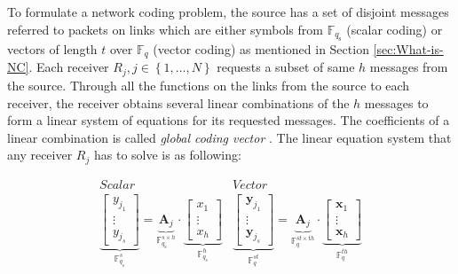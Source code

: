 To formulate a network coding problem, the source has a set of disjoint
messages referred to packets on links which are either symbols from
$\ensuremath{\mathbb{F}}_{q_{\mathrm{s}}}$ (scalar coding) or vectors
of length $t$ over $\ensuremath{\mathbb{F}}_{q}$ (vector coding)
as mentioned in Section \ref{sec:What-is-NC}. Each receiver $R_{j},j\in\left\{ 1,\ldots,N\right\} $
requests a subset of same $h$ messages from the source. Through all
the functions on the links from the source to each receiver, the receiver
obtains several linear combinations of the $h$ messages to form a
linear system of equations for its requested messages. The coefficients
of a linear combination is called \textit{global coding vector} \cite{Sanders:2003}.
The linear equation system that any receiver $R_{j}$ has to solve
is as following:

\begin{equation}
\begin{array}{c|c}
Scalar & Vector\\
\underset{\ensuremath{\mathbb{F}}_{q_{\mathrm{s}}}^{s}}{\underbrace{\left[\begin{array}{c}
y_{j_{1}}\\
\vdots\\
y_{j_{s}}
\end{array}\right]}}=\underset{\ensuremath{\mathbb{F}}_{q_{\mathrm{s}}}^{s\times h}}{\underbrace{\boldsymbol{A}_{j}}}\cdot\underset{\ensuremath{\mathbb{F}}_{q_{s}}^{h}}{\underbrace{\left[\begin{array}{c}
x_{1}\\
\vdots\\
x_{h}
\end{array}\right]}} & \underset{\ensuremath{\mathbb{F}}_{q}^{st}}{\underbrace{\left[\begin{array}{c}
\boldsymbol{y}_{j_{1}}\\
\vdots\\
\boldsymbol{y}_{j_{s}}
\end{array}\right]}}=\underset{\ensuremath{\mathbb{F}}_{q}^{st\times th}}{\underbrace{\boldsymbol{A}_{j}}}\cdot\underset{\ensuremath{\mathbb{F}}_{q}^{th}}{\underbrace{\left[\begin{array}{c}
\boldsymbol{x}_{1}\\
\vdots\\
\boldsymbol{x}_{h}
\end{array}\right]}}
\end{array}\label{eq:linear_system}
\end{equation}

